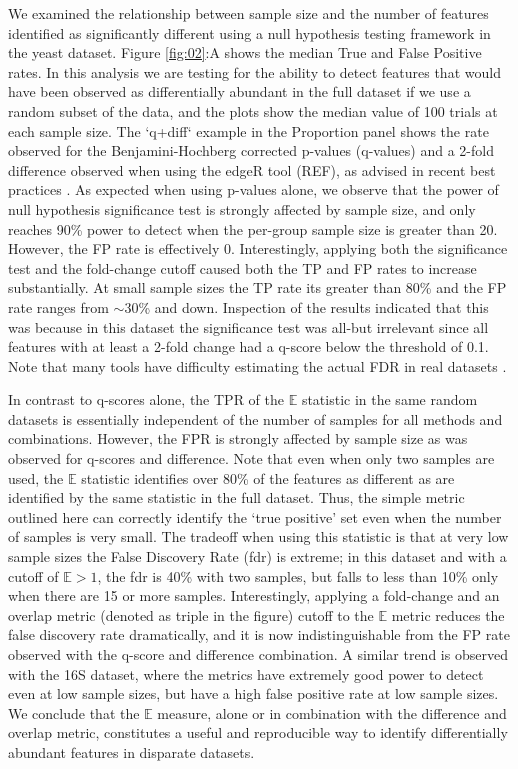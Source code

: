 \documentclass[fleqn,10pt,lineno]{wlpeerj}
\begin{document}
We examined the relationship between sample size and the number of features identified as significantly different using a null hypothesis testing framework in the yeast dataset. Figure \ref{fig:02}:A shows the median True and False Positive rates. In this analysis we are testing for the ability to detect  features that would have been observed as differentially abundant in the full dataset if we use  a random subset of the data, and the plots show the median value of 100 trials at each sample size. The `q+diff` example in the Proportion panel shows the rate observed for the  Benjamini-Hochberg corrected p-values (q-values) and a 2-fold difference observed when using the edgeR tool (REF), as advised in recent best practices \citep{Schurch:2016aa}. As expected when using p-values alone, we observe that the power of null hypothesis significance test is strongly affected by sample size, and only reaches 90\% power to detect when the per-group sample size is greater than 20. However, the FP rate is effectively 0.  Interestingly, applying both the significance test and the fold-change cutoff caused both the TP and FP rates to increase substantially. At small sample sizes the TP rate its greater than 80\% and the FP rate ranges from $\sim 30$\% and down. Inspection of the results indicated that this was because in this dataset the significance test was all-but irrelevant  since all features with at least a 2-fold change  had a q-score below the threshold of 0.1.   Note that many tools have difficulty estimating the actual FDR in real datasets \citep{Thorsen:2016aa,hawinkel2017}. 

In contrast to q-scores alone, the  TPR  of the $\mathbb{E}$ statistic in the same random datasets is essentially independent of the number of samples for all methods and combinations. However,  the FPR is strongly affected by sample size as was observed for q-scores and difference. Note that even when only two samples are used, the $\mathbb{E}$ statistic identifies over 80\% of the features as different as are identified by the same statistic in the full dataset. Thus, the simple metric outlined here  can correctly identify the `true positive' set even when the number of samples is very small. The tradeoff when using this statistic is that at very low sample sizes the False Discovery Rate (fdr) is extreme; in this dataset and with a cutoff of $\mathbb{E} > 1$, the fdr is 40\% with two samples, but falls to less than 10\% only when there are 15 or more samples. Interestingly, applying a fold-change and an overlap metric (denoted as triple in the figure) cutoff to the $\mathbb{E}$ metric reduces the false discovery rate dramatically, and it is now indistinguishable from the FP rate observed with the q-score and difference combination.  A similar trend is observed with the 16S dataset, where the metrics have extremely good power to detect even at low sample sizes, but have a high false positive rate at low sample sizes. We conclude that the $\mathbb{E}$ measure, alone or in combination with the difference and overlap metric, constitutes a useful and reproducible way to identify differentially abundant features in disparate datasets. 
\end{document}
